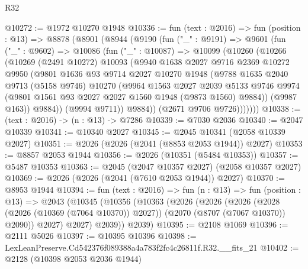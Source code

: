 \begin{lexlean}{R32}
\begin{coremodule}
@10272 := @1972 @10270 @1948
@10336 := fun (text : @2016) =>
  fun (position : @13) =>
  @8878
    (@8901
      (@8944
        (@9190
          (fun ("_" : @9191) =>
          @9601
            (fun ("_" : @9602) =>
            @10086
              (fun ("_" : @10087) =>
              @10099
                (@10260
                  (@10266
                    (@10269
                      (@2491 @10272)
                      @10093
                      (@9940
                        @1638
                        @2027
                        @9716
                        @2369
                        @10272
                        @9950
                        (@9801
                          @1636
                          @93
                          @9714
                          @2027
                          @10270
                          @1948
                          (@9788
                            @1635
                            @2040
                            @9713
                            (@5158 @9746)
                            @10270
                            (@9964
                              @1563
                              @2027
                              @2039
                              @5133
                              @9746
                              @9974
                              (@9801 @1561 @93 @2027 @2027 @1560 @1948 (@9873 @1560) @9884))
                            (@9987 @163))
                          @9884))
                      (@9994 @9711))
                    @9884))
                (@2671 @9706 @9726)))))))
@10338 := (text : @2016) -> (n : @13) -> @7286
@10339 := @7030 @2036
@10340 := @2047 @10339
@10341 := @10340 @2027
@10345 := @2045 @10341 (@2058 @10339 @2027)
@10351 := @2026 (@2026 (@2041 (@8853 @2053 @1944)) @2027)
@10353 := @8857 @2053 @1944
@10356 := @2026 (@10351 (@5484 @10353))
@10357 := @5487 @10353
@10363 := @2045 (@2047 @10357 @2027) (@2058 @10357 @2027)
@10369 := @2026 (@2026 (@2041 (@7610 @2053 @1944)) @2027)
@10370 := @8953 @1944
@10394 := fun (text : @2016) =>
  fun (n : @13) =>
  fun (position : @13) =>
  @2043
    (@10345
      (@10356
        (@10363
          (@2026
            (@2026
              (@2026
                (@2028 (@2026 (@10369 (@7064 @10370)) @2027))
                (@2070 (@8707 (@7067 @10370)) @2090))
              @2027)
            @2027)
          @2039))
      @2039)
@10395 := @2108 @1069
@10396 := @2111 @5026
@10397 := @10395 @10396
@10398 := LexLeanPreserve.Cd542376f089388a4a783f2fc4c26811f.R32.__fits_21
@10402 := @2128 (@10398 @2053 @2036 @1944)

\end{coremodule}
\end{lexlean}
